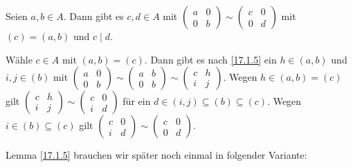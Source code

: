\documentclass[../../main.tex]{subfiles}
\begin{document}
\begin{lem}\label{17.1.7}
    Seien $a,b\in A$. Dann gibt es $c,d\in A$ mit $\begin{pmatrix*}a&0\\0&b\end{pmatrix*}\sim\begin{pmatrix*}c&0\\0&d\end{pmatrix*}$ mit $(c)=(a,b)$ und $c\mid d$.
\end{lem}
\begin{cproof}
    Wähle $c\in A$ mit $(a,b)=(c)$. Dann gibt es nach \ref{17.1.5} ein $h\in (a,b)$ und $i,j\in (b)$ mit $\begin{pmatrix*}a&0\\0&b\end{pmatrix*}\sim\begin{pmatrix*}a&b\\0&b\end{pmatrix*}\sim\begin{pmatrix*}c&h\\i&j\end{pmatrix*}$. Wegen $h\in (a,b)=(c)$ gilt $\begin{pmatrix*}c&h\\i&j\end{pmatrix*}\sim \begin{pmatrix*}c&0\\i&d\end{pmatrix*}$ für ein $d\in (i,j)\subseteq(b)\subseteq(c)$. Wegen $i\in (b)\subseteq(c)$ gilt $\begin{pmatrix*}c&0\\i&d\end{pmatrix*}\sim \begin{pmatrix*}c&0\\0&d\end{pmatrix*}$.
\end{cproof}

Lemma \ref{17.1.5} brauchen wir später noch einmal in folgender Variante:
\end{document}
